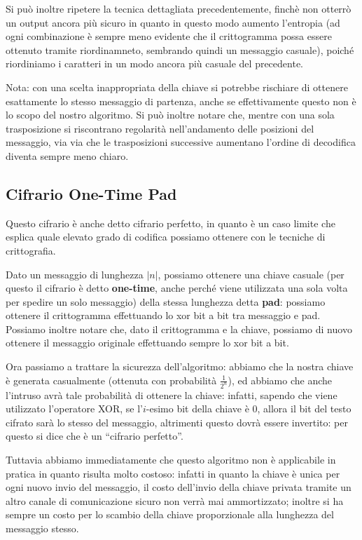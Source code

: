 Si può inoltre ripetere la tecnica dettagliata precedentemente, finchè non 
otterrò un output ancora più sicuro in quanto in questo
	modo aumento l'entropia (ad ogni combinazione è sempre meno evidente che il crittogramma
	possa essere ottenuto tramite riordinamneto, sembrando quindi un messaggio casuale), poiché riordiniamo i caratteri in
	un modo ancora più casuale del precedente.

Nota: con una scelta inappropriata della chiave si potrebbe rischiare di 
ottenere esattamente lo stesso messaggio di partenza, anche se effettivamente
questo non è lo scopo del nostro algoritmo. Si può inoltre notare che, mentre
con una sola trasposizione si riscontrano regolarità nell'andamento delle 
posizioni del messaggio, via via che le trasposizioni successive aumentano
l'ordine di decodifica diventa sempre meno chiaro.

\subsection{Cifrario One-Time Pad}
Questo cifrario è anche detto cifrario perfetto, in quanto è un caso limite che 
esplica quale elevato grado di codifica possiamo ottenere con le tecniche di
crittografia.

Dato un messaggio di lunghezza $|n|$, possiamo ottenere una chiave casuale (per 
questo il cifrario è detto \textbf{one-time}, anche perché viene utilizzata
una sola volta per spedire un solo messaggio) della
stessa lunghezza detta \textbf{pad}: possiamo ottenere il crittogramma effettuando
lo xor bit a bit tra messaggio e pad. Possiamo inoltre notare che, dato il 
crittogramma e la chiave, possiamo di nuovo ottenere il messaggio originale
effettuando sempre lo xor bit a bit. 

Ora passiamo a trattare la sicurezza dell'algoritmo: abbiamo che la nostra
chiave è generata casualmente (ottenuta con probabilità $\frac{1}{2^n}$), ed 
abbiamo che anche l'intruso avrà tale probabilità di ottenere la chiave: infatti,
sapendo che viene utilizzato l'operatore XOR, se l'$i$-esimo bit della chiave è
0, allora il bit del testo cifrato sarà lo stesso del messaggio, altrimenti questo dovrà essere invertito:
per questo si dice che è un ``cifrario perfetto''.

Tuttavia abbiamo immediatamente che questo algoritmo non è applicabile in
pratica in quanto risulta molto costoso: infatti in quanto la chiave è unica
per ogni nuovo invio del messaggio, il costo dell'invio della chiave privata
tramite un altro canale di comunicazione sicuro non verrà mai ammortizzato; 
inoltre si ha sempre un costo per lo scambio della chiave proporzionale alla 
lunghezza del messaggio stesso.

